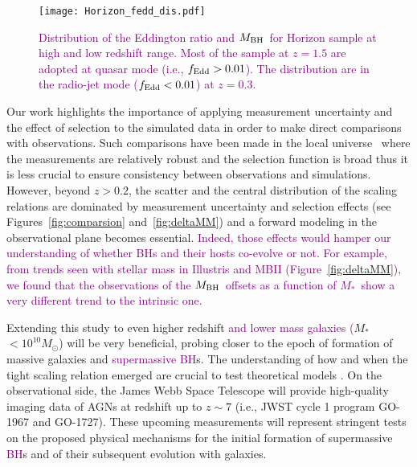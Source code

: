 \documentclass[twocolumn]{aastex631}
\newcommand{\red}[1]{\textcolor{purple}{#1}}
\def\smass{{$M_*$}}
\def\mbh{$M_{\rm BH}$}
\begin{document}
\begin{figure}
\centering
\texttt{[image: Horizon\_fedd\_dis.pdf]}
\caption{\label{fig:fedd} 
\red{Distribution of the Eddington ratio and \mbh\ for Horizon sample at high and low redshift range. Most of the sample at $z=1.5$ are adopted at quasar mode (i.e., $f_{\rm Edd}>0.01$). The distribution are in the radio-jet mode ($f_{\rm Edd}<0.01$) at $z=0.3$.}
}
\end{figure} 

Our work highlights the importance of applying measurement uncertainty and the effect of selection to the simulated data in order to make direct comparisons with observations. Such comparisons have been made in the local universe~\citep[e.g.,][]{Habouzit2021} where the measurements are relatively robust and the selection function is broad thus it is less crucial to ensure consistency between observations and simulations. However, beyond $z>0.2$, the scatter and the central distribution of the scaling relations are dominated by measurement uncertainty and selection effects (see Figures~\ref{fig:comparsion} and~\ref{fig:deltaMM}) and a forward modeling in the observational plane becomes essential. \red{Indeed, those effects would hamper our understanding of whether BHs and their hosts co-evolve or not. For example, from trends seen with stellar mass in Illustris and MBII (Figure~\ref{fig:deltaMM}), we found that the observations of the \mbh\ offsets as a function of \smass\  show a very different trend to the intrinsic one.}


Extending this study to even higher redshift \red{and lower mass galaxies (}\smass\ $<10^{10}M_{\odot}$) will be very beneficial, probing closer to the epoch of formation of massive galaxies and \red{supermassive BH}s. The understanding of how and when the tight scaling relation emerged are crucial to test theoretical models \citep{Volonteri2021}. On the observational side, the James Webb Space Telescope will provide high-quality imaging data of AGNs at redshift up to $z\sim7$ (i.e., JWST cycle 1 program GO-1967 and GO-1727). These upcoming measurements will represent stringent tests on the proposed physical mechanisms for the initial formation of supermassive \red{BH}s and of their subsequent evolution with galaxies.
\end{document}

